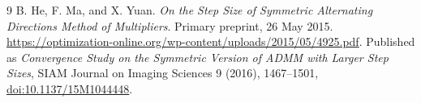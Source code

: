 \documentclass[11pt,a4paper]{article}
\theoremstyle{remark}
\begin{document}
{\begin{thebibliography}{9}
 B. He, F. Ma, and X. Yuan. \emph{On the Step Size of Symmetric Alternating Directions Method of Multipliers}. Primary preprint, 26 May 2015. \url{https://optimization-online.org/wp-content/uploads/2015/05/4925.pdf}. Published as \emph{Convergence Study on the Symmetric Version of ADMM with Larger Step Sizes}, SIAM Journal on Imaging Sciences 9 (2016), 1467--1501, \href{https://doi.org/10.1137/15M1044448}{doi:10.1137/15M1044448}.
\end{thebibliography}
}
\end{document}
